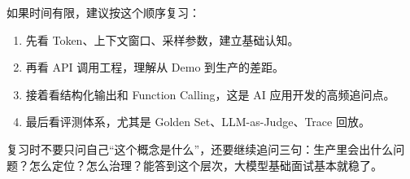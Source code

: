 \documentclass[9pt,a4paper,twocolumn]{ctexart}
\begin{document}
如果时间有限，建议按这个顺序复习：


\begin{enumerate}[itemsep=1pt, topsep=2pt]
  \item 先看 Token、上下文窗口、采样参数，建立基础认知。
  \item 再看 API 调用工程，理解从 Demo 到生产的差距。
  \item 接着看结构化输出和 Function Calling，这是 AI 应用开发的高频追问点。
  \item 最后看评测体系，尤其是 Golden Set、LLM-as-Judge、Trace 回放。
\end{enumerate}


复习时不要只问自己“这个概念是什么”，还要继续追问三句：生产里会出什么问题？怎么定位？怎么治理？能答到这个层次，大模型基础面试基本就稳了。
\end{document}
